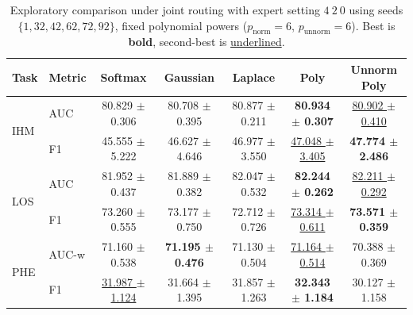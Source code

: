 \begin{table}[h]
\centering
\small
\setlength{\tabcolsep}{4pt}
\begin{tabular}{llccccc}
\toprule
Task & Metric & Softmax & Gaussian & Laplace & Poly & Unnorm Poly \\
\midrule
\multirow{2}{*}{IHM} & AUC & 80.829 $\pm$ 0.306 & 80.708 $\pm$ 0.395 & 80.877 $\pm$ 0.211 & \textbf{80.934 $\pm$ 0.307} & \underline{80.902 $\pm$ 0.410} \\
 & F1 & 45.555 $\pm$ 5.222 & 46.627 $\pm$ 4.646 & 46.977 $\pm$ 3.550 & \underline{47.048 $\pm$ 3.405} & \textbf{47.774 $\pm$ 2.486} \\
\midrule
\multirow{2}{*}{LOS} & AUC & 81.952 $\pm$ 0.437 & 81.889 $\pm$ 0.382 & 82.047 $\pm$ 0.532 & \textbf{82.244 $\pm$ 0.262} & \underline{82.211 $\pm$ 0.292} \\
 & F1 & 73.260 $\pm$ 0.555 & 73.177 $\pm$ 0.750 & 72.712 $\pm$ 0.726 & \underline{73.314 $\pm$ 0.611} & \textbf{73.571 $\pm$ 0.359} \\
\midrule
\multirow{2}{*}{PHE} & AUC-w & 71.160 $\pm$ 0.538 & \textbf{71.195 $\pm$ 0.476} & 71.130 $\pm$ 0.504 & \underline{71.164 $\pm$ 0.514} & 70.388 $\pm$ 0.369 \\
 & F1 & \underline{31.987 $\pm$ 1.124} & 31.664 $\pm$ 1.395 & 31.857 $\pm$ 1.263 & \textbf{32.343 $\pm$ 1.184} & 30.127 $\pm$ 1.158 \\
\bottomrule
\end{tabular}
\caption{Exploratory comparison under joint routing with expert setting $4\ 2\ 0$ using seeds $\{1,32,42,62,72,92\}$, fixed polynomial powers ($p_\text{norm}=6$, $p_\text{unnorm}=6$). Best is \textbf{bold}, second-best is \underline{underlined}.}
\label{tab:explore_dominance1_constp6p6_6seed_1324267292_joint420_gating_table}
\end{table}
